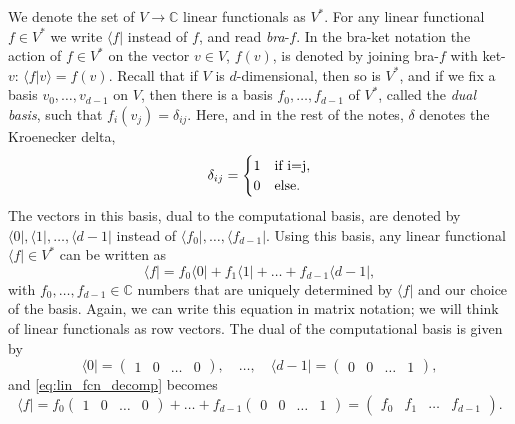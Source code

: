 \documentclass{article}
\theoremstyle{definition}
\newcommand{\bra}[1]{\langle #1 \vert}
\newcommand{\scalprod}[2]{\langle #1 \vert #2 \rangle}
\begin{document}
We denote the set of $V\to \mathbb{C}$ linear functionals as $V^*$. For any linear functional $f\in V^*$ we write $\bra{f}$ instead of $f$, and read \emph{bra}-$f$. In the bra-ket notation the action of $f\in V^*$ on the vector $v\in V$, $f(v)$, is denoted by joining bra-$f$ with ket-$v$: $\scalprod{f}{v} = f(v)$. Recall that if $V$ is $d$-dimensional, then so is $V^*$, and if we fix a basis $v_0, \dots, v_{d-1}$ on $V$, then there is a basis $f_0, \dots, f_{d-1}$ of $V^*$, called the \emph{dual basis}, such that $f_i(v_j) = \delta_{ij}$. Here, and in the rest of the notes, $\delta$ denotes the Kroenecker delta, 
\begin{equation*}
   \delta_{ij} = \begin{cases}
      1 & \text{if } $i=j$,\\
      0 & \text{else.}
   \end{cases}
\end{equation*}
The vectors in this basis, dual to the computational basis, are denoted by $\bra{0}, \bra{1}, \dots, \bra{d-1}$ instead of $\bra{f_0}, \dots, \bra{f_{d-1}}$. Using this basis, any linear functional $\bra{f}\in V^*$ can be written as 
\begin{equation}\label{eq:lin_fcn_decomp}
  \bra{f} = f_0 \bra{0} + f_1 \bra{1} + \dots + f_{d-1} \bra{d-1},
\end{equation}
with $f_0,\dots,f_{d-1}\in \mathbb{C}$ numbers that are uniquely determined by $\bra{f}$ and our choice of the basis. Again, we can write this equation in matrix notation; we will think of linear functionals as row vectors. The dual of the computational basis is given by
\begin{equation*}
  \bra{0} = \begin{pmatrix}
    1 & 0& \dots & 0
  \end{pmatrix}, \quad \dots, \quad
  \bra{d-1} = \begin{pmatrix}
  0 & 0& \dots & 1
\end{pmatrix},
\end{equation*}
and \cref{eq:lin_fcn_decomp} becomes 
\begin{equation*}
   \bra{f} = f_0 \begin{pmatrix}
     1 & 0& \dots & 0
   \end{pmatrix} + \dots + 
    f_{d-1} \begin{pmatrix}
      0 & 0& \dots & 1
    \end{pmatrix} = 
    \begin{pmatrix}
     f_0 & f_1& \dots & f_{d-1}
   \end{pmatrix} .
\end{equation*}
\end{document}
